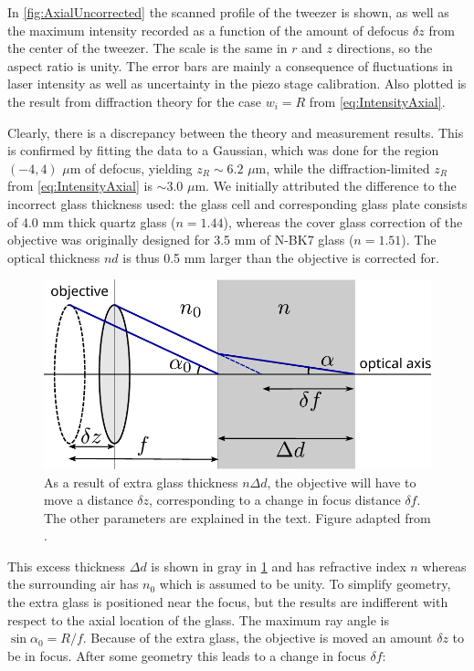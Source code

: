 In \cref{fig:AxialUncorrected} the scanned profile of the tweezer is shown, as well as the maximum intensity recorded as a function of the amount of defocus $\delta z$ from the center of the tweezer.
The scale is the same in $r$ and $z$ directions, so the aspect ratio is unity.
The error bars are mainly a consequence of fluctuations in laser intensity as well as uncertainty in the piezo stage calibration.
Also plotted is the result from diffraction theory for the case $w_i =R$ from \cref{eq:IntensityAxial}.

Clearly, there is a discrepancy between the theory and measurement results.
This is confirmed by fitting the data to a Gaussian, which was done for the region $(-4, 4)$ $\mu$m of defocus, yielding $z_R \sim 6.2$ $\mu$m, while the diffraction-limited $z_R$ from \cref{eq:IntensityAxial} is $\sim 3.0$ $\mu$m.
We initially attributed the difference to the incorrect glass thickness used: the glass cell and corresponding glass plate consists of 4.0 mm thick quartz glass ($n=1.44$), whereas the cover glass correction of the objective was originally designed for 3.5 mm of N-BK7 glass ($n=1.51$).
The optical thickness $nd$ is thus 0.5 mm larger than the objective is corrected for. 
\begin{figure}[]
    \centering
    \includegraphics[width=0.55\linewidth]{figures/sphericalAberration.pdf}
    \caption{As a result of extra glass thickness $n\Delta d$, the objective will have to move a distance $\delta z$, corresponding to a change in focus distance $\delta f$.
    The other parameters are explained in the text.
    Figure adapted from \cite{Iwaniuk2011}.}
    \label{fig:SphericalSketch}
\end{figure}
This excess thickness $\Delta d$ is shown in gray in \cref{fig:SphericalSketch} and has refractive index $n$ whereas the surrounding air has $n_0$ which is assumed to be unity.
To simplify geometry, the extra glass is positioned near the focus, but the results are indifferent with respect to the axial location of the glass.
The maximum ray angle is $\sin{\alpha_0} = R/f$. 
Because of the extra glass, the objective is moved an amount $\delta z$ to be in focus.
After some geometry \cite{Iwaniuk2011} this leads to a change in focus $\delta f$:


